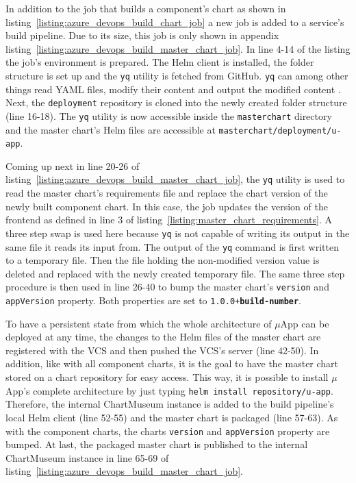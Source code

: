 In addition to the job that builds a component's chart as shown in
listing~\ref{listing:azure_devops_build_chart_job} a new job is added to a
service's build pipeline. Due to its size, this job is only shown in appendix
listing~\ref{listing:azure_devops_build_master_chart_job}. In line 4-14 of the
listing the job's environment is prepared. The Helm client is installed, the
folder structure is set up and the \texttt{yq} utility is fetched from GitHub.
\texttt{yq} can among other things read YAML files, modify their content and
output the modified content \autocite{Farahyq2017}. Next, the
\texttt{deployment} repository is cloned into the newly created folder
structure (line 16-18). The \texttt{yq} utility is now accessible inside the
\texttt{master\textunderscore chart} directory and the master chart's Helm
files are accessible at \texttt{master\textunderscore chart/deployment/u-app}.

Coming up next in line 20-26 of
listing~\ref{listing:azure_devops_build_master_chart_job}, the \texttt{yq}
utility is used to read the master chart's requirements file and replace the
chart version of the newly built component chart. In this case, the job updates
the version of the frontend as defined in line 3 of
listing~\ref{listing:master_chart_requirements}. A three step swap is used here
because \texttt{yq} is not capable of writing its output in the same file it
reads its input from. The output of the \texttt{yq} command is first written to
a temporary file. Then the file holding the non-modified version value is
deleted and replaced with the newly created temporary file. The same three step
procedure is then used in line 26-40 to bump the master chart's
\texttt{version} and \texttt{appVersion} property. Both properties are set to
\texttt{1.0.0+\textbf{build-number}}.

To have a persistent state from which the whole architecture of $\mu$App can be
deployed at any time, the changes to the Helm files of the master chart are
registered with the \ac{VCS} and then pushed the \ac{VCS}'s server (line
42-50). In addition, like with all component charts, it is the goal to have the
master chart stored on a chart repository for easy access. This way, it is
possible to install $\mu$App's complete architecture by just typing
\texttt{helm install repository/u-app}. Therefore, the internal ChartMuseum
instance is added to the build pipeline's local Helm client (line 52-55) and
the master chart is packaged (line 57-63). As with the component charts, the
charts \texttt{version} and \texttt{appVersion} property are bumped. At last,
the packaged master chart is published to the internal ChartMuseum instance in
line 65-69 of listing~\ref{listing:azure_devops_build_master_chart_job}.


